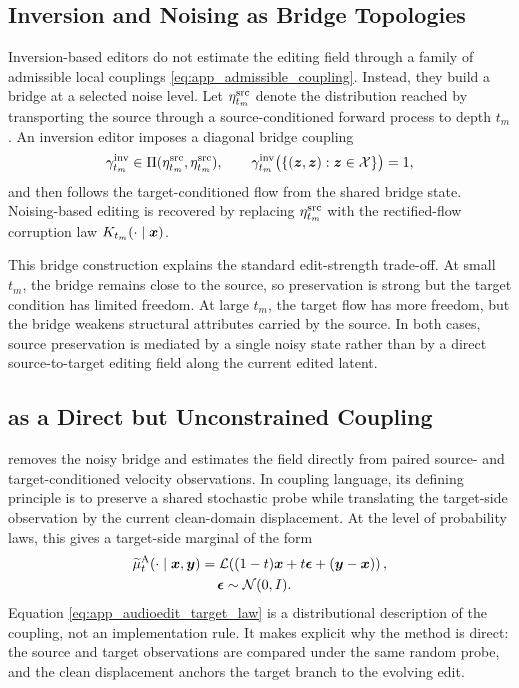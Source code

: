 \subsection{Inversion and Noising as Bridge Topologies}

Inversion-based editors do not estimate the editing field through a family of admissible local couplings \eqref{eq:app_admissible_coupling}.
Instead, they build a bridge at a selected noise level.
Let $\eta_{t_m}^{\mathrm{src}}$ denote the distribution reached by transporting the source through a source-conditioned forward process to depth $t_m$.
An inversion editor imposes a diagonal bridge coupling
\begin{equation}
    \label{eq:app_inversion_bridge}
    \gamma_{t_m}^{\mathrm{inv}}
    \in
    \Pi(\eta_{t_m}^{\mathrm{src}},\eta_{t_m}^{\mathrm{src}}),
    \qquad
    \gamma_{t_m}^{\mathrm{inv}}
    \big(\{(\boldsymbol{z},\boldsymbol{z}):\boldsymbol{z}\in\mathcal{X}\}\big)=1,
\end{equation}
and then follows the target-conditioned flow from the shared bridge state.
Noising-based editing is recovered by replacing $\eta_{t_m}^{\mathrm{src}}$ with the rectified-flow corruption law $K_{t_m}(\cdot\mid\boldsymbol{x})$.

This bridge construction explains the standard edit-strength trade-off.
At small $t_m$, the bridge remains close to the source, so preservation is strong but the target condition has limited freedom.
At large $t_m$, the target flow has more freedom, but the bridge weakens structural attributes carried by the source.
In both cases, source preservation is mediated by a single noisy state rather than by a direct source-to-target editing field along the current edited latent.

\subsection{\method as a Direct but Unconstrained Coupling}

\method removes the noisy bridge and estimates the field directly from paired source- and target-conditioned velocity observations.
In coupling language, its defining principle is to preserve a shared stochastic probe while translating the target-side observation by the current clean-domain displacement.
At the level of probability laws, this gives a target-side marginal of the form
\begin{equation}
    \label{eq:app_audioedit_target_law}
    \begin{aligned}
    \widetilde{\mu}^{\mathrm{A}}_t(\cdot\mid\boldsymbol{x},\boldsymbol{y})
    &=
    \mathcal{L}\!\left(
    (1-t)\boldsymbol{x}
    +
    t\boldsymbol{\epsilon}
    +
    (\boldsymbol{y}-\boldsymbol{x})
    \right),
    \\
    &\hspace{1.2em}
    \boldsymbol{\epsilon}\sim\mathcal{N}(0,I).
    \end{aligned}
\end{equation}
Equation \eqref{eq:app_audioedit_target_law} is a distributional description of the coupling, not an implementation rule.
It makes explicit why the method is direct: the source and target observations are compared under the same random probe, and the clean displacement anchors the target branch to the evolving edit.

